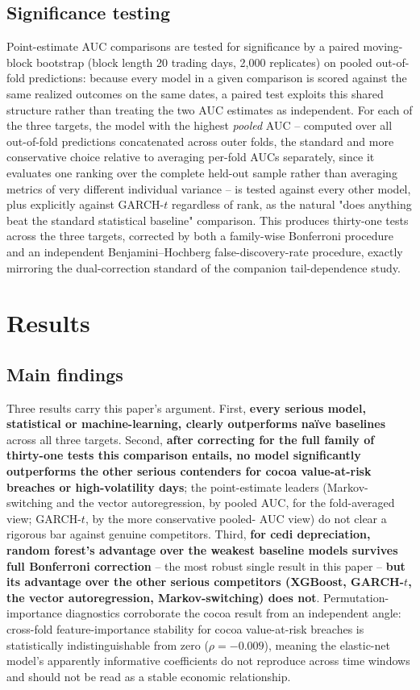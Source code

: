 \documentclass[final,3p,times,authoryear]{elsarticle}
\begin{document}
\subsection{Significance testing}
\label{sec:sigtest}

Point-estimate AUC \citep{fawcett2006} comparisons are tested for
significance by a paired
moving-block bootstrap (block length 20 trading days, 2,000 replicates)
on pooled out-of-fold predictions: because every model in a given
comparison is scored against the same realized outcomes on the same
dates, a paired test exploits this shared structure rather than treating
the two AUC estimates as independent. For each of the three targets, the
model with the highest \emph{pooled} AUC -- computed over all
out-of-fold predictions concatenated across outer folds, the standard
and more conservative choice relative to averaging per-fold AUCs
separately, since it evaluates one ranking over the complete held-out
sample rather than averaging metrics of very different individual
variance -- is tested against every other model, plus explicitly against
GARCH-$t$ regardless of rank, as the natural "does anything beat the
standard statistical baseline" comparison. This produces thirty-one
tests across the three targets, corrected by both a family-wise
Bonferroni procedure and an independent Benjamini--Hochberg
false-discovery-rate procedure, exactly mirroring the dual-correction
standard of the companion tail-dependence study.

\section{Results}
\label{sec:results}

\subsection{Main findings}

Three results carry this paper's argument. First, \textbf{every serious
model, statistical or machine-learning, clearly outperforms na\"ive
baselines} across all three targets. Second, \textbf{after correcting
for the full family of thirty-one tests this comparison entails, no
model significantly outperforms the other serious contenders for cocoa
value-at-risk breaches or high-volatility days}; the point-estimate
leaders (Markov-switching and the vector autoregression, by pooled AUC,
for the fold-averaged view; GARCH-$t$, by the more conservative pooled-
AUC view) do not clear a rigorous bar against genuine competitors. Third,
\textbf{for cedi depreciation, random forest's advantage over the
weakest baseline models survives full Bonferroni correction} -- the most
robust single result in this paper -- \textbf{but its advantage over the
other serious competitors (XGBoost, GARCH-$t$, the vector autoregression,
Markov-switching) does not}. Permutation-importance diagnostics
corroborate the cocoa result from an independent angle: cross-fold
feature-importance stability for cocoa value-at-risk breaches is
statistically indistinguishable from zero ($\rho = -0.009$), meaning the
elastic-net model's apparently informative coefficients do not reproduce
across time windows and should not be read as a stable economic
relationship.
\end{document}
